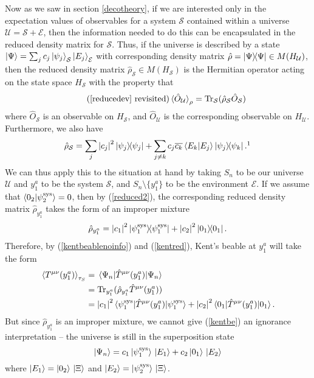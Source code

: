 Now as we saw in section \ref{decotheory}, if we are interested only in the expectation values of observables for a system $\mathcal{S}$ contained within a universe $\mathcal{U}=\mathcal{S}+\mathcal{E}$, then the information needed to do this can be encapsulated in the reduced density matrix for $\mathcal{S}$. Thus, if the universe is described by a state 
$\ket{\Psi}=\sum_j c_j \ket{\psi_j}_\mathcal{S}\ket{E_j}_\mathcal{E}$ with corresponding density matrix $\hat{\rho}=\dyad{\Psi}\in M(H_\mathcal{U})$, then the reduced density matrix $\hat{\rho}_\mathcal{S}\in M(H_\mathcal{S})$ is the Hermitian operator acting on the state space $H_\mathcal{S}$ with the property that 
\begin{equation}\tag{\ref{reducedev} revisited}
\ev*{\hat{O}_\mathcal{U}}_\rho=\Tr_\mathcal{S}(\hat{\rho}_\mathcal{S}\hat{O}_\mathcal{S})
\end{equation}
where $\hat{O}_\mathcal{S}$ is an observable on $H_\mathcal{S}$,  and $\hat{O}_\mathcal{U}$ is the corresponding observable on $H_\mathcal{U}$. Furthermore, we also have
\begin{equation}\label{reduced2}
\hat{\rho}_\mathcal{S}=\sum_j \abs{c_j}^2\dyad{\psi_j}+\sum_{j\neq k} c_j\overline{c_k}\ip{E_k}{E_j}\dyad{\psi_j}{\psi_k}.\protect\footnotemark
\end{equation}
We can thus apply this to the situation at hand by taking $S_n$ to be our universe $\mathcal{U}$ and $y^a_1$ to be the system $\mathcal{S}$, and $S_n\setminus \{y^a_1\}$ to be the environment $\mathcal{E}$. If we assume that $\ip{0_2}{\psi_2^\text{sys}}= 0$, then by (\ref{reduced2}), the corresponding reduced density matrix $\hat{\rho}_{y^a_1}$ takes the form of an improper mixture
\begin{equation}\label{kentred}
\hat{\rho}_{y^a_1}= \abs{c_1}^2\dyad{\psi_1^\text{sys}}+\abs{c_2}^2\dyad{0_1}.
\end{equation}
Therefore, by (\ref{kentbeablenoinfo}) and (\ref{kentred}), Kent's beable at $y^a_1$ will take the form 
\begin{equation}\label{kentbe}
\begin{split}
\ev*{T^{\mu\nu}(y^a_1)}_{\tau_S}&= \ev*{\hat{T}^{\mu\nu}(y^a_1)}{\Psi_n} \\
&=\Tr_{y^a_1}(\hat{\rho}_{y^a_1}\hat{T}^{\mu\nu}(y^a_1))\\
&=\abs{c_1}^2\ev*{\hat{T}^{\mu\nu}(y^a_1)}{\psi_1^\text{sys}}+\abs{c_2}^2\ev*{\hat{T}^{\mu\nu}(y^a_1)}{0_1}.
\end{split}
\end{equation}
But since $\hat{\rho}_{y^a_1}$ is an improper mixture, we cannot give (\ref{kentbe}) an ignorance interpretation -- the universe is still in the superposition state
$$\ket{\Psi_n}=c_1 \ket*{\psi_1^\text{sys}}\ket*{E_1}+c_2 \ket*{0_1}\ket*{E_2}$$ where $\ket{E_1}=\ket{0_2}\ket*{\Xi}$ and $\ket{E_2}=\ket{\psi_2^\text{sys}}\ket*{\Xi}$. 

